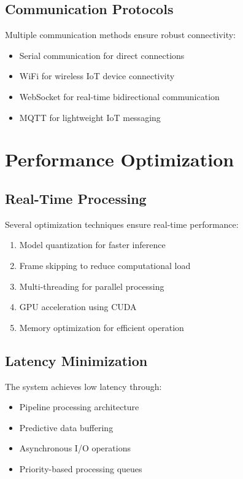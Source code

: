 \subsection{Communication Protocols}

Multiple communication methods ensure robust connectivity:

\begin{itemize}
    \item Serial communication for direct connections
    \item WiFi for wireless IoT device connectivity
    \item WebSocket for real-time bidirectional communication
    \item MQTT for lightweight IoT messaging
\end{itemize}

\section{Performance Optimization}

\subsection{Real-Time Processing}

Several optimization techniques ensure real-time performance:

\begin{enumerate}
    \item Model quantization for faster inference
    \item Frame skipping to reduce computational load
    \item Multi-threading for parallel processing
    \item GPU acceleration using CUDA
    \item Memory optimization for efficient operation
\end{enumerate}

\subsection{Latency Minimization}

The system achieves low latency through:

\begin{itemize}
    \item Pipeline processing architecture
    \item Predictive data buffering
    \item Asynchronous I/O operations
    \item Priority-based processing queues
\end{itemize}

